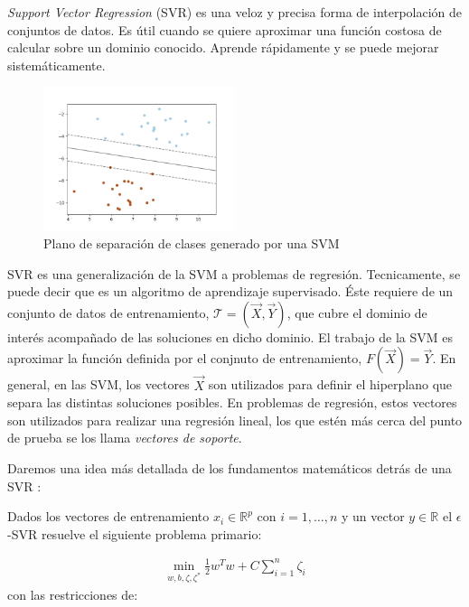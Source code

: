   \par \textit{Support Vector Regression} (SVR)\cite{support_vector_regression, review_svr}
    es una veloz y precisa forma de interpolación de conjuntos de datos.
    Es útil cuando se quiere aproximar una función costosa de calcular sobre un
    dominio conocido. Aprende rápidamente y se puede mejorar sistemáticamente.

    \begin{figure}
    \centering%
    \includegraphics[width=0.5\textwidth]{images/svm_hiperplane}%
    \caption{Plano de separación de clases generado por una SVM}\label{fig:svm}
    \end{figure}

  \par SVR es una generalización de la SVM a problemas de regresión. Tecnicamente,
    se puede decir que es un algoritmo de aprendizaje supervisado. Éste
    requiere de un conjunto de datos de entrenamiento,
    $\mathcal{T} = (\vec{X}, \vec{Y})$, que cubre el dominio de interés acompañado
    de las soluciones en dicho dominio. El trabajo de la SVM es aproximar la función
    definida por el conjnuto de entrenamiento, $F(\vec{X}) = \vec{Y}$. En general,
    en las SVM, los vectores $\vec{X}$ son utilizados para definir el hiperplano que
    separa las distintas soluciones posibles. En problemas de regresión, estos
    vectores son utilizados para realizar una regresión lineal, los que estén
    más cerca del punto de prueba se los llama \textit{vectores de soporte}.

    Daremos una idea más detallada de los fundamentos matemáticos detrás de una
    SVR \cite{svr_tutorial}:

    Dados los vectores de entrenamiento $x_{i} \in \mathbb{R}^{p}$ con $i = 1, \dots ,n$
    y un vector $y \in \mathbb{R}$ el $\epsilon$-SVR resuelve el siguiente problema
    primario:

    \begin{align}
      \min\limits_{w, b, \zeta, \zeta^{*}} \frac{1}{2} w^{T} w + C \sum_{i = 1}^{n} \zeta_{i}
    \end{align}
    con las restricciones de:


